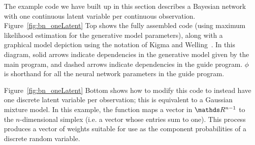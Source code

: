 The example code we have built up in this section describes a Bayesian network with one continuous latent variable per continuous observation. Figure~\ref{fig:bn_oneLatent} Top shows the fully assembled code (using maximum likelihood estimation for the generative model parameters), along with a graphical model depiction using the notation of Kigma and Welling~\cite{AEVB}. In this diagram, solid arrows indicate dependencies in the generative model given by the main program, and dashed arrows indicate dependencies in the guide program. $\phi$ is shorthand for all the neural network parameters in the guide program.

Figure~\ref{fig:bn_oneLatent} Bottom shows how to modify this code to instead have one discrete latent variable per observation; this is equivalent to a Gaussian mixture model. In this example, the  function maps a vector in $\Reals^{n-1}$ to the $n$-dimensional simplex (i.e. a vector whose entries sum to one). This process produces a vector of weights suitable for use as the component probabilities of a discrete random variable.


